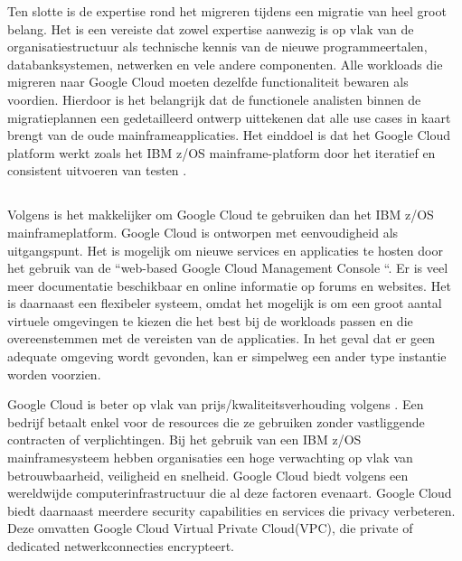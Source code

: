Ten slotte is de expertise rond het migreren tijdens een migratie van heel groot belang. Het is een vereiste dat zowel expertise aanwezig is op vlak van de organisatiestructuur als technische kennis van de nieuwe programmeertalen, databanksystemen, netwerken en vele andere componenten. Alle workloads die migreren naar Google Cloud moeten dezelfde functionaliteit bewaren als voordien. Hierdoor is het belangrijk dat de functionele analisten binnen de migratieplannen een gedetailleerd ontwerp uittekenen dat alle use cases in kaart brengt van de oude mainframeapplicaties. Het einddoel is dat het Google Cloud platform werkt zoals het IBM z/OS mainframe-platform door het iteratief en consistent uitvoeren van testen \autocite{Astadia2021}. 

\subsection{}
\label{sec:De voordelen van migreren naar Google Cloud volgens Astadia}

Volgens \citeauthor{Astadia2021} is het makkelijker om Google Cloud te gebruiken dan het IBM z/OS mainframeplatform. Google Cloud is ontworpen met eenvoudigheid als uitgangspunt. Het is mogelijk om nieuwe services en applicaties te hosten door het gebruik van de ``web-based Google Cloud Management Console ``.  Er is veel meer documentatie beschikbaar en online informatie op forums en websites. Het is daarnaast een flexibeler systeem, omdat het mogelijk is om een groot aantal virtuele omgevingen te kiezen die het best bij de workloads passen en die overeenstemmen met de vereisten van de applicaties. In het geval dat er geen adequate omgeving wordt gevonden, kan er simpelweg een ander type instantie worden voorzien. 

Google Cloud is beter op vlak van prijs/kwaliteitsverhouding volgens \textcite{Astadia2021}. Een bedrijf betaalt enkel voor de resources die ze gebruiken zonder vastliggende contracten of verplichtingen. Bij het gebruik van een IBM z/OS mainframesysteem hebben organisaties een hoge verwachting op vlak van betrouwbaarheid, veiligheid en snelheid. Google Cloud biedt volgens \textcite{Astadia2021}  een wereldwijde computerinfrastructuur die al deze factoren evenaart. Google Cloud biedt daarnaast meerdere security capabilities en services  die privacy verbeteren. Deze omvatten Google Cloud Virtual Private Cloud(VPC), die private of dedicated netwerkconnecties encrypteert. 

